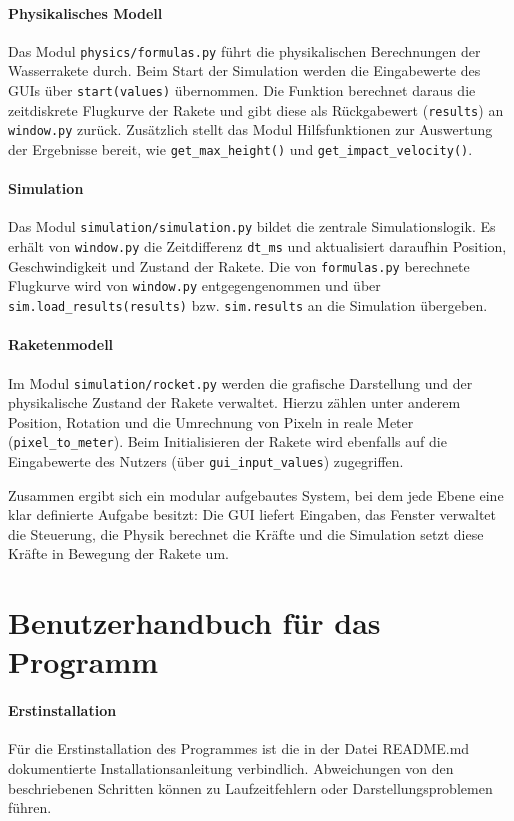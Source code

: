 \documentclass{SimSemBericht} %
\begin{document}
\paragraph{Physikalisches Modell}
Das Modul \texttt{physics/formulas.py} führt die physikalischen Berechnungen der
Wasserrakete durch. Beim Start der Simulation werden die Eingabewerte des GUIs über
\texttt{start(values)} übernommen. Die Funktion berechnet daraus die zeitdiskrete
Flugkurve der Rakete und gibt diese als Rückgabewert (\texttt{results}) an
\texttt{window.py} zurück.
Zusätzlich stellt das Modul Hilfsfunktionen zur Auswertung der Ergebnisse bereit,
wie \texttt{get\_max\_height()} und \texttt{get\_impact\_velocity()}.

\paragraph{Simulation}
Das Modul \texttt{simulation/simulation.py} bildet die zentrale Simulationslogik.
Es erhält von \texttt{window.py} die Zeitdifferenz \texttt{dt\_ms} und aktualisiert
daraufhin Position, Geschwindigkeit und Zustand der Rakete. 
Die von \texttt{formulas.py} berechnete Flugkurve wird von \texttt{window.py}
entgegengenommen und über \texttt{sim.load\_results(results)} bzw.
\texttt{sim.results} an die Simulation übergeben.

\paragraph{Raketenmodell}
Im Modul \texttt{simulation/rocket.py} werden die grafische Darstellung und
der physikalische Zustand der Rakete verwaltet. 
Hierzu zählen unter anderem Position, Rotation und die Umrechnung von Pixeln
in reale Meter (\texttt{pixel\_to\_meter}). 
Beim Initialisieren der Rakete wird ebenfalls auf die Eingabewerte des Nutzers
(über \texttt{gui\_input\_values}) zugegriffen.

Zusammen ergibt sich ein modular aufgebautes System, bei dem jede Ebene
eine klar definierte Aufgabe besitzt: Die GUI liefert Eingaben, das
Fenster verwaltet die Steuerung, die Physik berechnet die Kräfte und
die Simulation setzt diese Kräfte in Bewegung der Rakete um.

\section{Benutzerhandbuch für das Programm}

\paragraph{Erstinstallation}
Für die Erstinstallation des Programmes ist die in der Datei README.md dokumentierte Installationsanleitung verbindlich.
Abweichungen von den beschriebenen Schritten können zu Laufzeitfehlern oder Darstellungsproblemen führen.
\end{document}
